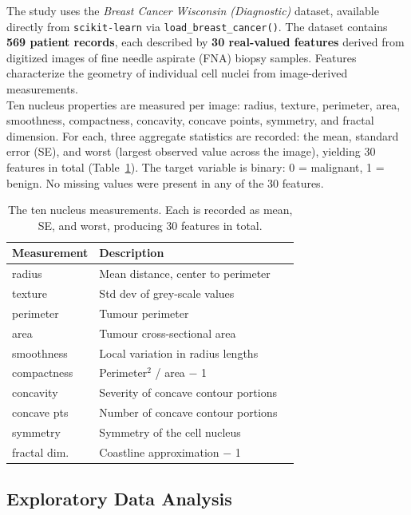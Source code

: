 \documentclass[twocolumn, fontsize=10pt]{article}
\begin{document}
The study uses the {\textit{Breast Cancer Wisconsin (Diagnostic)}} dataset, available directly from \texttt{scikit-learn} via \texttt{load\_breast\_cancer()}. The dataset contains \textbf{569 patient records}, each described by \textbf{30 real-valued features} derived from digitized images of fine needle aspirate (FNA) biopsy samples. Features characterize the geometry of individual cell nuclei from image-derived measurements.\\

Ten nucleus properties are measured per image: radius, texture, perimeter, area, smoothness, compactness, concavity, concave points, symmetry, and fractal dimension. For each, three aggregate statistics are recorded: the mean, standard error (SE), and worst (largest observed value across the image), yielding 30 features in total (Table~\ref{tab:feature_groups}). The target variable is binary: 0 = malignant, 1 = benign. No missing values were present in any of the 30 features.

\begin{table}[H]
\centering
\small
\setlength{\tabcolsep}{3pt}
\begin{tabular}{llp{3.8cm}}
\toprule
\textbf{Measurement} & \textbf{Description} \\
\midrule
radius    & Mean distance, center to perimeter \\
texture & Std dev of grey-scale values \\
perimeter  & Tumour perimeter \\
area       & Tumour cross-sectional area \\
smoothness & Local variation in radius lengths \\
compactness & Perimeter$^2$ / area $-$ 1 \\
concavity  & Severity of concave contour portions \\
concave pts  & Number of concave contour portions \\
symmetry   & Symmetry of the cell nucleus \\
fractal dim. & Coastline approximation $-$ 1 \\
\bottomrule
\end{tabular}
\caption{The ten nucleus measurements. Each is recorded as mean, SE, and worst, producing 30 features in total.}
\label{tab:feature_groups}
\end{table}


\subsection{Exploratory Data Analysis}
\end{document}
